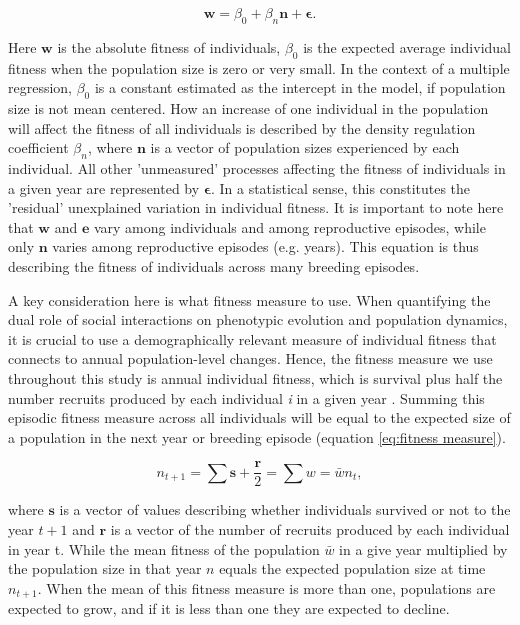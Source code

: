 \documentclass{article}
\begin{document}
\begin{equation} \label{eq: fitness1}
\bm{w}=\beta_{0} +\beta_{n} \bm{n}  +  \bm{\epsilon}.
\end{equation}

\noindent Here $\bm{w}$ is the absolute fitness of individuals, $\beta_{0}$ is the expected average individual fitness when the population size is zero or very small. In the context of a multiple regression, $\beta_{0}$ is a constant estimated as the intercept in the model, if population size is not mean centered. How an increase of one individual in the population will affect the fitness of all individuals is described by the density regulation coefficient $\beta_{n}$, where $\bm{n}$ is a vector of population sizes experienced by each individual. All other 'unmeasured' processes affecting the fitness of individuals in a given year are represented by $ \mathbf{\epsilon}$. In a statistical sense, this constitutes the 'residual' unexplained variation in individual fitness. It is important to note here that $\mathbf{w}$ and $\mathbf{e}$ vary among individuals and among reproductive episodes, while only $\mathbf{n}$ varies among reproductive episodes (e.g. years). This equation is thus describing the fitness of individuals across many breeding episodes.

A key consideration here is what fitness measure to use. When quantifying the dual role of social interactions on phenotypic evolution and population dynamics, it is crucial to use a demographically relevant measure of individual fitness that connects to annual population-level changes. Hence, the fitness measure we use throughout this study is annual individual fitness, which is survival plus half the number recruits produced by each individual \textit{i} in a given year \citep{Saether2015}. Summing this episodic fitness measure across all individuals will be equal to the expected size of a population in the next year or breeding episode (equation  \ref{eq:fitness measure}). 

\begin{equation} \label{eq:fitness measure}
n_{t+1}=\sum \bm{s} + \frac{\bm{r}}{2}= \sum w=\bar{w}n_{t}, 
\end{equation}

\noindent where  $\bm{s}$ is a vector of values describing whether individuals survived or not to the year $t+1$ and $\bm{r}$ is a vector of the number of recruits produced by each individual in year t. While the mean fitness of the population $\bar{w}$ in a give year multiplied by the population size in that year $n$ equals the expected population size at time $n_{t + 1}$. When the mean of this fitness measure is more than one, populations are expected to grow, and if it is less than one they are expected to decline.
\end{document}
